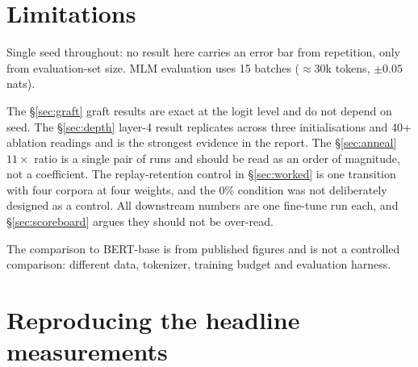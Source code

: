 \documentclass[11pt,a4paper]{article}
\newcommand{\nats}[1]{\ensuremath{#1}\,nats}
\begin{document}
\section{Limitations}

Single seed throughout: no result here carries an error bar from repetition, only from
evaluation-set size. MLM evaluation uses 15 batches ($\approx$30k tokens, $\pm$\nats{0.05}).

The \S\ref{sec:graft} graft results are exact at the logit level and do not depend on seed. The
\S\ref{sec:depth} layer-4 result replicates across three initialisations and 40+ ablation
readings and is the strongest evidence in the report. The \S\ref{sec:anneal} $11\times$ ratio
is a single pair of runs and should be read as an order of magnitude, not a coefficient. The
replay-retention control in \S\ref{sec:worked} is one transition with four corpora at four
weights, and the 0\% condition was not deliberately designed as a control. All downstream
numbers are one fine-tune run each, and \S\ref{sec:scoreboard} argues they should not be
over-read.

The comparison to BERT-base is from published figures and is not a controlled comparison:
different data, tokenizer, training budget and evaluation harness.

\appendix
\section{Reproducing the headline measurements}
\end{document}
